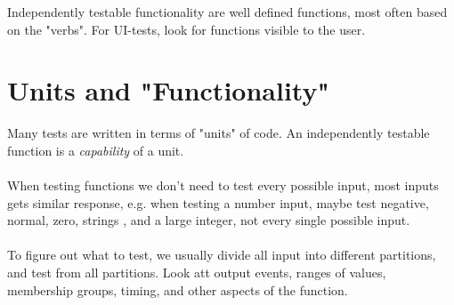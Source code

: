 Independently testable functionality are well defined functions, most often based on the "verbs". For UI-tests, look for functions visible to the user.

\section{Units and "Functionality"}
Many tests are written in terms of "units" of code. An independently testable function is a \textit{capability} of a unit.\\
\\
When testing functions we don't need to test every possible input, most inputs gets similar response, e.g. when testing a number input, maybe test negative, normal, zero, strings , and a large integer, not every single possible input.\\
\\
To figure out what to test, we usually divide all input into different partitions, and test from all partitions. Look att output events, ranges of values, membership groups, timing, and other aspects of the function.\\
\\
